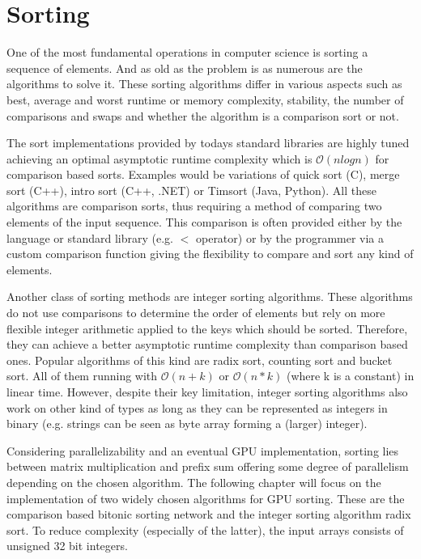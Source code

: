 \section{Sorting}
\label{sec:sorting}

One of the most fundamental operations in computer science is sorting a sequence of elements. And as old as the problem is as numerous are the algorithms to solve it. These sorting algorithms differ in various aspects such as best, average and worst runtime or memory complexity, stability, the number of comparisons and swaps and whether the algorithm is a comparison sort or not.

The sort implementations provided by todays standard libraries are highly tuned achieving an optimal asymptotic runtime complexity which is $\mathcal{O}(n log n)$ for comparison based sorts. Examples would be variations of quick sort (C), merge sort (C++), intro sort (C++, .NET) or Timsort (Java, Python). All these algorithms are comparison sorts, thus requiring a method of comparing two elements of the input sequence. This comparison is often provided either by the language or standard library (e.g. $<$ operator) or by the programmer via a custom comparison function giving the flexibility to compare and sort any kind of elements.

Another class of sorting methods are integer sorting algorithms. These algorithms do not use comparisons to determine the order of elements but rely on more flexible integer arithmetic applied to the keys which should be sorted. Therefore, they can achieve a better asymptotic runtime complexity than comparison based ones. Popular algorithms of this kind are radix sort, counting sort and bucket sort. All of them running with $\mathcal{O}(n + k)$ or $\mathcal{O}(n * k)$ (where k is a constant) in linear time.
However, despite their key limitation, integer sorting algorithms also work on other kind of types as long as they can be represented as integers in binary (e.g. strings can be seen as byte array forming a (larger) integer).

Considering parallelizability and an eventual GPU implementation, sorting lies between matrix multiplication and prefix sum offering some degree of parallelism depending on the chosen algorithm. The following chapter will focus on the implementation of two widely chosen algorithms for GPU sorting. These are the comparison based bitonic sorting network and the integer sorting algorithm radix sort. To reduce complexity (especially of the latter), the input arrays consists of unsigned 32 bit integers.


